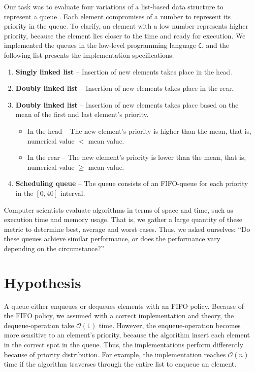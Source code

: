 \documentclass[a4paper,11pt]{kth-mag}
\newcommand*{\skippara}{\par\vspace{\baselineskip} \noindent}
\begin{document}
\skippara Our task was to evaluate four variations of a list-based data structure to represent a queue \cite{Uppgiftl9:online}.
Each element compromises of a number to represent its priority in the queue.
To clarify, an element with a low number represents higher priority, because the element lies closer to the time and ready for execution.
We implemented the queues in the low-level programming language \texttt{C}, and the following list presents the implementation specifications:
\begin{enumerate}
    \item \textbf{Singly linked list} -- Insertion of new elements takes place in the head.
    \item \textbf{Doubly linked list} -- Insertion of new elements takes place in the rear.
        \item \textbf{Doubly linked list} -- Insertion of new elements takes place based on the mean of the first and last element's priority.
        \begin{itemize}
            \item In the head -- The new element's priority is higher than the mean, that is, \\numerical value $<$ mean value.
            \item In the rear -- The new element's priority is lower than the mean, that is,\\numerical value $\ge$ mean value.
        \end{itemize}
    \item \textbf{Scheduling queue} -- The queue consists of an FIFO-queue for each priority in the $[0,40]$ interval.
\end{enumerate}

\skippara 
Computer scientists evaluate algorithms in terms of space and time, such as execution time and memory usage.
That is, we gather a large quantity of these metric to determine best, average and worst cases.
Thus, we asked ourselves: ``Do these queues achieve similar performance, or does the performance vary depending on the circumstance?''


\clearpage
\section{Hypothesis}
A queue either enqueues or dequeues elements with an FIFO policy.
Because of the FIFO policy, we assumed with a correct implementation and theory, the dequeue-operation take $\mathcal{O}(1)$ time.
However, the enqueue-operation becomes more sensitive to an element's priority, because the algorithm insert each element in the correct spot in the queue.
Thus, the implementations perform differently because of priority distribution.
For example, the implementation reaches $\mathcal{O}(n)$ time if the algorithm traverses through the entire list to enqueue an element.
\end{document}
